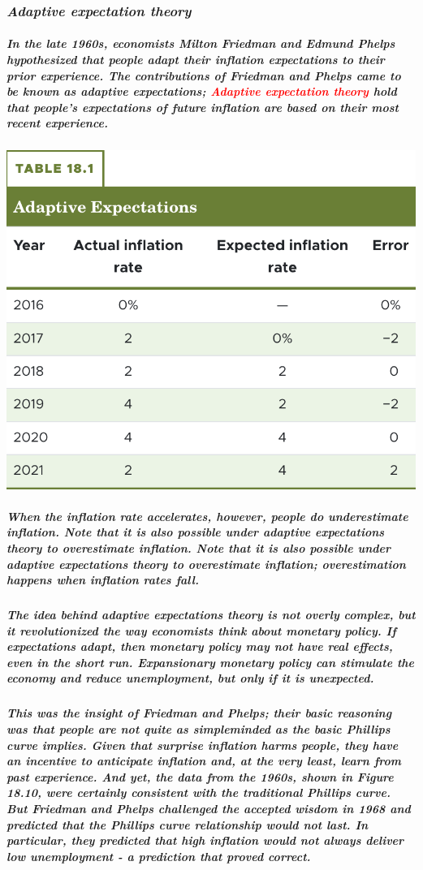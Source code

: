 \documentclass[11pt]{article} %
\begin{document}
\subsubsection*{\textbf{\textit{Adaptive expectation theory}}}
\subparagraph*{
In the late 1960s, economists Milton Friedman and Edmund Phelps hypothesized that people adapt their inflation expectations to their prior experience. The contributions of Friedman and Phelps came to be known as adaptive expectations; \textbf{\textcolor{red}{Adaptive expectation theory}} hold that people's expectations of future inflation are based on their most recent experience. 
}
\begin{center}
\includegraphics[scale=0.5]{images/Table 18.1.png} 
\end{center}
\subparagraph*{
When the inflation rate \textit{accelerates}, however, people do underestimate inflation. Note that it is also possible under adaptive expectations theory to overestimate inflation. Note that it is also possible under adaptive expectations theory to overestimate inflation; overestimation happens when inflation rates fall.
}
\subparagraph*{
The idea behind adaptive expectations theory is not overly complex, but it revolutionized the way economists think about monetary policy. If expectations adapt, then monetary policy may not have real effects, even in the short run. Expansionary monetary policy can stimulate the economy and reduce unemployment, but only if it is unexpected.}
\subparagraph*{This was the insight of Friedman and Phelps; their basic reasoning was that people are not quite as simpleminded as the basic Phillips curve implies. Given that surprise inflation harms people, they have an incentive to anticipate inflation and, at the very least, learn from past experience. And yet, the data from the 1960s, shown in Figure 18.10, were certainly consistent with the traditional Phillips curve. But Friedman and Phelps challenged the accepted wisdom in 1968 and predicted that the Phillips curve relationship would not last. In particular, they predicted that high inflation would not always deliver low unemployment - a prediction that proved correct.}
\end{document}
